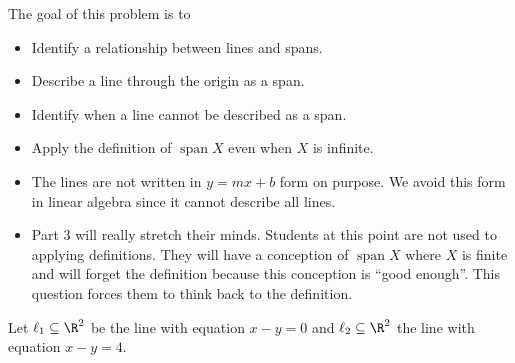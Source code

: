 \documentclass{problemset}
\DeclareMathOperator{\Span}{span}
\begin{document}
	\question
	\begin{annotation}
		\begin{goals}

			The goal of this problem is to
			\begin{itemize}
				\item Identify a relationship between lines and spans.
				\item Describe a line through the origin as a span.
				\item Identify when a line cannot be described as a span.
				\item Apply the definition of $\Span X$ even when $X$ is infinite.
			\end{itemize}
		\end{goals}

		\begin{notes}
			\begin{itemize}
				\item The lines are not written in $y=mx+b$ form on purpose.
					We avoid this form in linear algebra since it cannot
					describe all lines.
				\item Part 3 will really stretch their minds. Students at this point are not used
					to applying definitions. They will have a conception of $\Span X$
					where $X$ is finite and will forget the definition because
					this conception is ``good enough''. This question forces
					them to think back to the definition.
			\end{itemize}
		\end{notes}
	\end{annotation}
	\label{linesAsSpans}
	Let $\ell_1\subseteq \R^2$ be the line with equation $x-y=0$ and $\ell_2\subseteq\R^2$
	the line with equation $x-y=4$.
\end{document}

